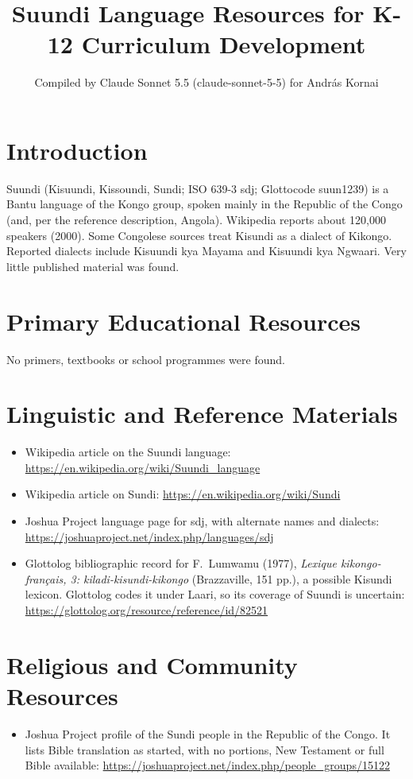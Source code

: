 \documentclass[12pt]{article}
\title{Suundi Language Resources for K-12 Curriculum Development}
\author{Compiled by Claude Sonnet 5.5 (claude-sonnet-5-5) for Andr\'as Kornai}
\date{}
\begin{document}
\maketitle

\section{Introduction}
Suundi (Kisuundi, Kissoundi, Sundi; ISO 639-3 sdj; Glottocode suun1239) is a Bantu language of the Kongo group, spoken mainly in the Republic of the Congo (and, per the reference description, Angola). Wikipedia reports about 120,000 speakers (2000). Some Congolese sources treat Kisundi as a dialect of Kikongo. Reported dialects include Kisuundi kya Mayama and Kisuundi kya Ngwaari. Very little published material was found.

\section{Primary Educational Resources}
No primers, textbooks or school programmes were found.

\section{Linguistic and Reference Materials}
\begin{itemize}
\item Wikipedia article on the Suundi language: \url{https://en.wikipedia.org/wiki/Suundi_language}
\item Wikipedia article on Sundi: \url{https://en.wikipedia.org/wiki/Sundi}
\item Joshua Project language page for sdj, with alternate names and dialects: \url{https://joshuaproject.net/index.php/languages/sdj}
\item Glottolog bibliographic record for F.\ Lumwamu (1977), \emph{Lexique kikongo-fran\c{c}ais, 3: kiladi-kisundi-kikongo} (Brazzaville, 151 pp.), a possible Kisundi lexicon. Glottolog codes it under Laari, so its coverage of Suundi is uncertain: \url{https://glottolog.org/resource/reference/id/82521}
\end{itemize}

\section{Religious and Community Resources}
\begin{itemize}
\item Joshua Project profile of the Sundi people in the Republic of the Congo. It lists Bible translation as started, with no portions, New Testament or full Bible available: \url{https://joshuaproject.net/index.php/people_groups/15122}
\end{itemize}
\end{document}
